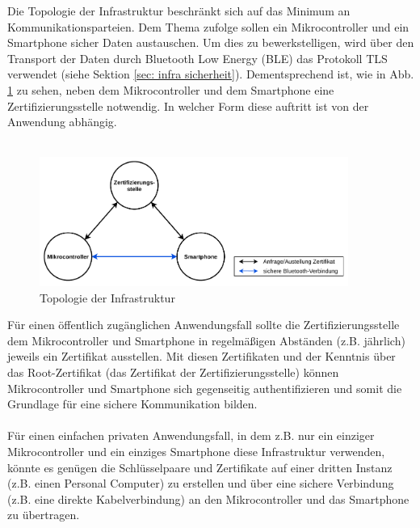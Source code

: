 Die Topologie der Infrastruktur beschränkt sich auf das Minimum an Kommunikationsparteien. Dem Thema zufolge sollen ein Mikrocontroller und ein Smartphone sicher Daten austauschen. Um dies zu bewerkstelligen, wird über den Transport der Daten durch Bluetooth Low Energy (BLE) das Protokoll TLS verwendet (siehe Sektion \ref{sec: infra sicherheit}). Dementsprechend ist, wie in Abb. \ref{fig: infra topologie} zu sehen, neben dem Mikrocontroller und dem Smartphone eine Zertifizierungsstelle notwendig. In welcher Form diese auftritt ist von der Anwendung abhängig.
\\\\

\begin{figure}[H]
    \centering
    \includegraphics[width=0.9\textwidth]{graphics/infra_topologie.pdf}
    \caption[Topologie der Infrastruktur]{Topologie der Infrastruktur}
    \label{fig: infra topologie}
\end{figure}

Für einen öffentlich zugänglichen Anwendungsfall sollte die Zertifizierungsstelle dem Mikrocontroller und Smartphone in regelmäßigen Abständen (z.B. jährlich) jeweils ein Zertifikat ausstellen. Mit diesen Zertifikaten und der Kenntnis über das Root-Zertifikat (das Zertifikat der Zertifizierungsstelle) können Mikrocontroller und Smartphone sich gegenseitig authentifizieren und somit die Grundlage für eine sichere Kommunikation bilden.
\\\\
Für einen einfachen privaten Anwendungsfall, in dem z.B. nur ein einziger Mikrocontroller und ein einziges Smartphone diese Infrastruktur verwenden, könnte es genügen die Schlüsselpaare und Zertifikate auf einer dritten Instanz (z.B. einen Personal Computer) zu erstellen und über eine sichere Verbindung (z.B. eine direkte Kabelverbindung) an den Mikrocontroller und das Smartphone zu übertragen.